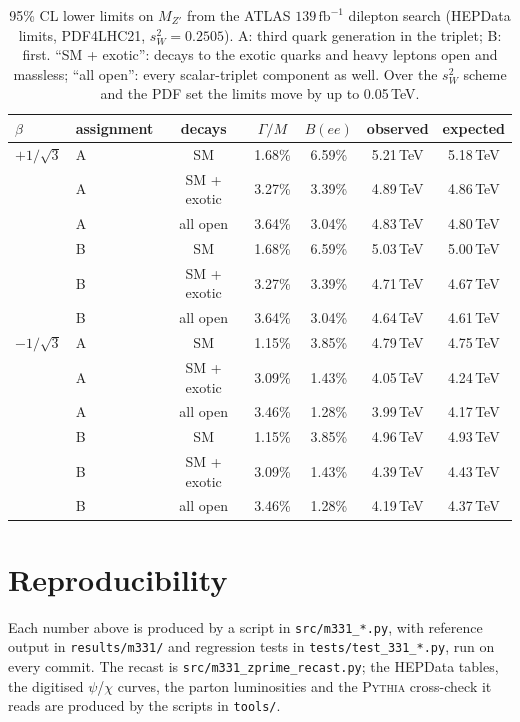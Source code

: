 \documentclass[11pt,a4paper]{article}
\begin{document}
\begin{table}[h]\centering
\begin{tabular}{llccccc}
\toprule
$\beta$ & assignment & decays & $\Gamma/M$ & $B(ee)$ & observed & expected\\
\midrule
$+1/\sqrt3$ & A & SM & 1.68\% & 6.59\% & 5.21\,TeV & 5.18\,TeV\\
            & A & SM + exotic & 3.27\% & 3.39\% & 4.89\,TeV & 4.86\,TeV\\
            & A & all open & 3.64\% & 3.04\% & 4.83\,TeV & 4.80\,TeV\\
            & B & SM & 1.68\% & 6.59\% & 5.03\,TeV & 5.00\,TeV\\
            & B & SM + exotic & 3.27\% & 3.39\% & 4.71\,TeV & 4.67\,TeV\\
            & B & all open & 3.64\% & 3.04\% & 4.64\,TeV & 4.61\,TeV\\
\midrule
$-1/\sqrt3$ & A & SM & 1.15\% & 3.85\% & 4.79\,TeV & 4.75\,TeV\\
            & A & SM + exotic & 3.09\% & 1.43\% & 4.05\,TeV & 4.24\,TeV\\
            & A & all open & 3.46\% & 1.28\% & 3.99\,TeV & 4.17\,TeV\\
            & B & SM & 1.15\% & 3.85\% & 4.96\,TeV & 4.93\,TeV\\
            & B & SM + exotic & 3.09\% & 1.43\% & 4.39\,TeV & 4.43\,TeV\\
            & B & all open & 3.46\% & 1.28\% & 4.19\,TeV & 4.37\,TeV\\
\bottomrule
\end{tabular}
\caption{95\% CL lower limits on $M_{Z'}$ from the ATLAS $139\,\text{fb}^{-1}$ dilepton
search (HEPData limits, PDF4LHC21, $s_W^2=0.2505$). A: third quark generation in the
triplet; B: first. ``SM + exotic'': decays to the exotic quarks and heavy leptons open and
massless; ``all open'': every scalar-triplet component as well. Over the $s_W^2$ scheme
and the PDF set the limits move by up to 0.05\,TeV.}\label{tab:recast}
\end{table}

\section*{Reproducibility}

Each number above is produced by a script in \texttt{src/m331\_*.py}, with reference
output in \texttt{results/m331/} and regression tests in \texttt{tests/test\_331\_*.py},
run on every commit. The recast is \texttt{src/m331\_zprime\_recast.py}; the HEPData tables, the digitised
$\psi$/$\chi$ curves, the parton luminosities and the \textsc{Pythia} cross-check it reads
are produced by the scripts in \texttt{tools/}.
\end{document}
